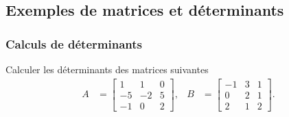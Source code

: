 \subsection{Exemples de matrices et déterminants}%

\subsubsection{Calculs de déterminants}
Calculer les déterminants des matrices suivantes 
\begin{align*}
  A & = \left[\begin{array}{rrr}
    1 & 1 & 0 \\ -5 & -2 & 5 \\ -1 & 0 & 2
    \end{array}\right], &
  B & = \left[\begin{array}{rrr}
    -1 & 3 & 1 \\ 0 & 2 & 1 \\ 2 & 1 & 2
    \end{array}\right].  
\end{align*}


